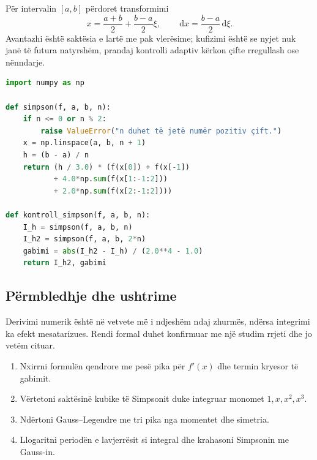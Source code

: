 \documentclass[11pt,oneside,openany]{book}
\newcommand{\dd}{\,\mathrm{d}}
\begin{document}
Për intervalin $[a,b]$ përdoret transformimi
\begin{equation}
 x=\frac{a+b}{2}+\frac{b-a}{2}\xi,\qquad
 \dd x=\frac{b-a}{2}\dd\xi.
\end{equation}
Avantazhi është saktësia e lartë me pak vlerësime; kufizimi është se nyjet nuk janë të futura natyrshëm, prandaj kontrolli adaptiv kërkon çifte rregullash ose nënndarje.

\begin{lstlisting}[language=Python,caption={Simpson i përbërë me kontroll të dyfishimit të rrjetit.}]
import numpy as np

def simpson(f, a, b, n):
    if n <= 0 or n % 2:
        raise ValueError("n duhet të jetë numër pozitiv çift.")
    x = np.linspace(a, b, n + 1)
    h = (b - a) / n
    return (h / 3.0) * (f(x[0]) + f(x[-1])
           + 4.0*np.sum(f(x[1:-1:2]))
           + 2.0*np.sum(f(x[2:-1:2])))

def kontroll_simpson(f, a, b, n):
    I_h = simpson(f, a, b, n)
    I_h2 = simpson(f, a, b, 2*n)
    gabimi = abs(I_h2 - I_h) / (2.0**4 - 1.0)
    return I_h2, gabimi
\end{lstlisting}

\subsection{Përmbledhje dhe ushtrime}
Derivimi numerik është në vetvete më i ndjeshëm ndaj zhurmës, ndërsa integrimi ka efekt mesatarizues. Rendi formal duhet konfirmuar me një studim rrjeti dhe jo vetëm cituar.
\begin{enumerate}
\item Nxirrni formulën qendrore me pesë pika për $f'(x)$ dhe termin kryesor të gabimit.
\item Vërtetoni saktësinë kubike të Simpsonit duke integruar monomet $1,x,x^2,x^3$.
\item Ndërtoni Gauss--Legendre me tri pika nga momentet dhe simetria.
\item Llogaritni periodën e lavjerrësit si integral dhe krahasoni Simpsonin me Gauss-in.
\end{enumerate}



\end{document}
